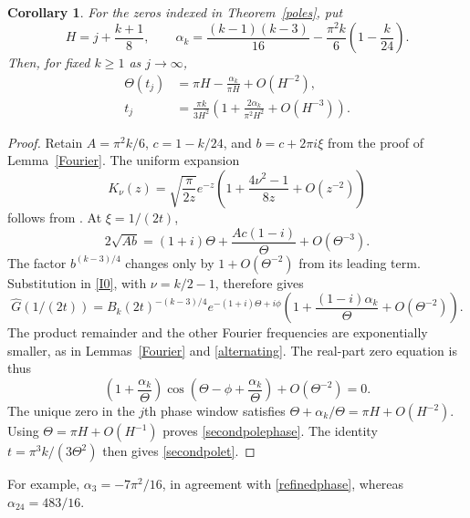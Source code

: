 \documentclass[11pt]{amsart}
\newtheorem{corollary}[theorem]{Corollary}
\theoremstyle{definition}
\theoremstyle{remark}
\numberwithin{equation}{section}
\begin{document}
\begin{corollary}\label{secondpolelaw}
For the zeros indexed in Theorem~\ref{poles}, put
\[
 H=j+\frac{k+1}{8},\qquad
 \alpha_k=\frac{(k-1)(k-3)}{16}
           -\frac{\pi^2k}{6}\left(1-\frac{k}{24}\right).
\]
Then, for fixed $k\ge1$ as $j\to\infty$,
\begin{align}
 \Theta(t_j)&=\pi H-\frac{\alpha_k}{\pi H}+O(H^{-2}),
                                      \label{secondpolephase}\\
 t_j&=\frac{\pi k}{3H^2}
       \left(1+\frac{2\alpha_k}{\pi^2H^2}+O(H^{-3})\right).
                                      \label{secondpolet}
\end{align}
\end{corollary}
\begin{proof}
Retain $A=\pi^2k/6$, $c=1-k/24$, and $b=c+2\pi i\xi$ from the proof of
Lemma~\ref{Fourier}. The uniform expansion
\[
 K_\nu(z)=\sqrt{\frac\pi{2z}}e^{-z}
       \left(1+\frac{4\nu^2-1}{8z}+O(z^{-2})\right)
\]
follows from \cite[\S10.40(i)]{DLMF}. At $\xi=1/(2t)$,
\[
 2\sqrt{Ab}=(1+i)\Theta+\frac{Ac(1-i)}{\Theta}
                         +O(\Theta^{-3}).
\]
The factor $b^{(k-3)/4}$ changes only by $1+O(\Theta^{-2})$ from its
leading term. Substitution in \eqref{I0}, with $\nu=k/2-1$, therefore gives
\[
 \widehat G(1/(2t))=B_k(2t)^{-(k-3)/4}e^{-(1+i)\Theta+i\phi}
       \left(1+\frac{(1-i)\alpha_k}{\Theta}+O(\Theta^{-2})\right).
\]
The product remainder and the other Fourier frequencies are exponentially
smaller, as in Lemmas~\ref{Fourier} and \ref{alternating}. The real-part
zero equation is thus
\[
 \left(1+\frac{\alpha_k}{\Theta}\right)
       \cos\left(\Theta-\phi+\frac{\alpha_k}{\Theta}\right)
       +O(\Theta^{-2})=0.
\]
The unique zero in the $j$th phase window satisfies
$\Theta+\alpha_k/\Theta=\pi H+O(H^{-2})$.
Using $\Theta=\pi H+O(H^{-1})$ proves \eqref{secondpolephase}.
The identity $t=\pi^3k/(3\Theta^2)$ then gives \eqref{secondpolet}.
\end{proof}

For example, $\alpha_3=-7\pi^2/16$, in agreement with
\eqref{refinedphase}, whereas $\alpha_{24}=483/16$.
\end{document}
